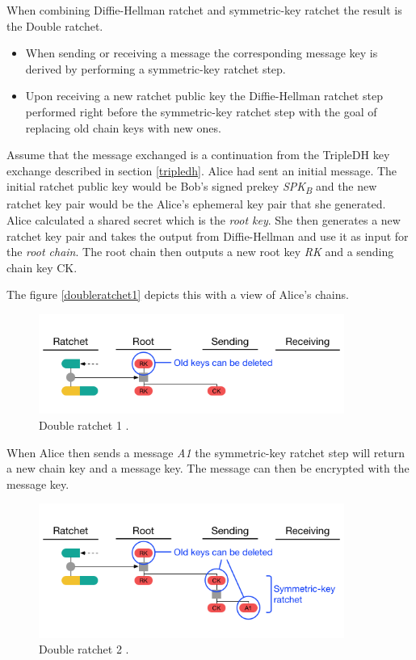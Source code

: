 When combining Diffie-Hellman ratchet and symmetric-key ratchet the result is the Double ratchet.

\begin{itemize}
	\item When sending or receiving a message the corresponding message key is derived by performing a symmetric-key ratchet step.
	\item Upon receiving a new ratchet public key the Diffie-Hellman ratchet step performed right before the symmetric-key ratchet step with the goal of replacing old chain keys with new ones.  
\end{itemize}

Assume that the message exchanged is a continuation from the TripleDH key exchange described in section \ref{tripledh}. Alice had sent an initial message. The initial ratchet public key would be Bob's signed prekey \emph{SPK\textsubscript{B}} and the new ratchet key pair would be the Alice's ephemeral key pair that she generated. Alice calculated a shared secret which is the \emph{root key}. She then generates a new ratchet key pair and takes the output from Diffie-Hellman and use it as input for the \emph{root chain}. The root chain then outputs a new root key \emph{RK} and a sending chain key {CK}.

The figure \ref{doubleratchet1} depicts this with a view of Alice's chains.


\begin{figure}[H]
	\centering
	\includegraphics[width=10cm]{figures/doubleratchet1.png}
	\caption{Double ratchet 1 \cite{doubleratchet}.}
	\label{fig:doubleratchet1}
\end{figure}

When Alice then sends a message \emph{A1} the symmetric-key ratchet step will return a new chain key and a message key. The message can then be encrypted with the message key.

\begin{figure}[H]
	\centering
	\includegraphics[width=10cm]{figures/doubleratchet2.png}
	\caption{Double ratchet 2 \cite{doubleratchet}.}
	\label{fig:doubleratchet2}
\end{figure}

